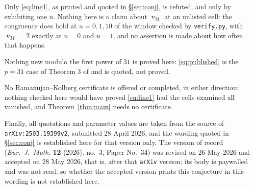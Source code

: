 \documentclass[11pt]{amsart}
\theoremstyle{remark}
\DeclareMathOperator{\vv}{v}
\begin{document}
Only \eqref{eq:line1}, as printed and quoted in \S\ref{sec:conj}, is refuted,
and only by exhibiting one $n$. Nothing here is a claim about $\vv_{31}$ at an
unlisted cell: the congruence does hold at $n=0,1,10$ of the window checked by
\texttt{verify.py}, with $\vv_{31}=2$ exactly at $n=0$ and $n=1$, and no
assertion is made about how often that happens.

Nothing new modulo the first power of $31$ is proved here: \eqref{eq:published}
is the $p=31$ case of Theorem 3 of \cite{Guadalupe} and is quoted, not proved.

No Ramanujan--Kolberg certificate is offered or completed, in either direction:
nothing checked here would have proved \eqref{eq:line1} had the cells examined
all vanished, and Theorem~\ref{thm:main} needs no certificate.

Finally, all quotations and parameter values are taken from the source of
\texttt{arXiv:\allowbreak 2503.19399v2}, submitted 28 April 2026, and the wording
quoted in \S\ref{sec:conj} is established here for that version only. The version
of record (\emph{Eur.\ J.\ Math.} \textbf{12} (2026), no.~3, Paper No.~34) was
revised on 26 May 2026 and accepted on 28 May 2026, that is, after that
\texttt{arXiv} version; its body is paywalled and was not read, so whether the
accepted version prints this conjecture in this wording is not established here.
\end{document}
